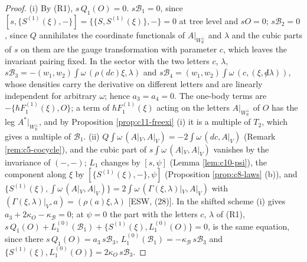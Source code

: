 \begin{proof}
(i) By (R1), $s\,Q_1(O)=0$. $s\mathcal B_1=0$, since $[s,\{S^{(1)}(\xi),-\}]=\{\{S,S^{(1)}(\xi)\},-\}=0$ at tree level and $sO=0$; $s\mathcal B_2=0$, since $Q$ annihilates the coordinate functionals of $A|_{W_{\mathbb R}^\perp}$ and $\lambda$ and the cubic parts of $s$ on them are the gauge transformation with parameter $c$, which leaves the invariant pairing fixed. In the sector with the two letters $c$, $\lambda$, $s\mathcal B_3=-(w_1,w_2)\int\omega\,(\rho(dc)\xi,\lambda)$ and $s\mathcal B_4=(w_1,w_2)\int\omega\,(c,(\xi,{\not d}\lambda))$, whose densities carry the derivative on different letters and are linearly independent for arbitrary $\omega$; hence $a_3=a_4=0$. The one-body terms are $-\{\hbar F_1^{(1)}(\xi),O\}$; a term of $\hbar F_1^{(1)}(\xi)$ acting on the letters $A|_{W_{\mathbb R}^\perp}$ of $O$ has the leg $A^*|_{W_{\mathbb R}^\perp}$, and by Proposition \ref{prop:c11-freexi} (i) it is a multiple of $T_2$, which gives a multiple of $\mathcal B_1$. (ii) $Q\int\omega\,(A|_V,A|_V)=-2\int\omega\,(dc,A|_V)$ (Remark \ref{rem:c5-cocycle}), and the cubic part of $s\int\omega\,(A|_V,A|_V)$ vanishes by the invariance of $(-,-)$; $L_1$ changes by $[s,\psi]$ (Lemma \ref{lem:c10-psi}), the component along $\xi$ by $[\{S^{(1)}(\xi),-\},\psi]$ (Proposition \ref{prop:c8-laws} (b)), and $\{S^{(1)}(\xi),\int\omega\,(A|_V,A|_V)\}=2\int\omega\,(\Gamma(\xi,\lambda)|_V,A|_V)$ with $(\Gamma(\xi,\lambda)|_V,a)=(\rho(a)\xi,\lambda)$ [ESW, (28)]. In the shifted scheme (i) gives $a_3+2\kappa_O-\kappa_{\mathcal B}=0$; at $\psi=0$ the part with the letters $c$, $\lambda$ of (R1), $s\,Q_1(O)+L_1^{(0)}(\mathcal B_1)+\{S^{(1)}(\xi),L_1^{(0)}(O)\}=0$, is the same equation, since there $s\,Q_1(O)=a_3\,s\mathcal B_3$, $L_1^{(0)}(\mathcal B_1)=-\kappa_{\mathcal B}\,s\mathcal B_3$ and $\{S^{(1)}(\xi),L_1^{(0)}(O)\}=2\kappa_O\,s\mathcal B_3$.
\end{proof}

